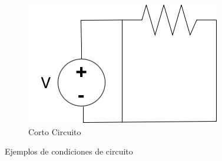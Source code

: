 \begin{figure}
     \begin{subfigure}{0.3\textwidth}
             \centering
             \includegraphics[width=\textwidth]{images/C01/CortoCircuito.png}
         \caption{Corto Circuito}
         \label{fig:CortoCirc}
     \end{subfigure}
     
     
     
     
     
        \caption{Ejemplos de condiciones de circuito}
        \label{fig:ejemplosCondiciones}
\end{figure}

    
    
    
    
        


